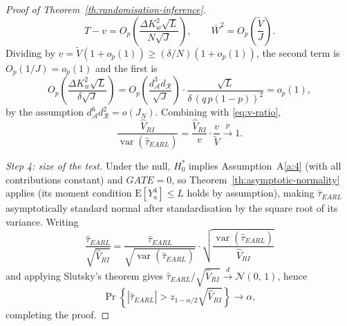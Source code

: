 \documentclass[sigconf,nonacm]{acmart}
\newcounter{assumption}
\newcommand{\E}{\mathrm E}
\DeclareMathOperator{\var}{var}
\begin{document}
\begin{proof}[Proof of Theorem~\ref{th:randomisation-inference}]
\begin{equation*}
        T - v = O_p\left(\frac{\Delta K_w^2\sqrt L}{N\sqrt J}\right),\qquad
        \bar W^2 = O_p\left(\frac{\tilde V}{J}\right).
    \end{equation*}
    Dividing by $v = \tilde V(1+o_p(1)) \ge (\delta/N)(1+o_p(1))$, the second term is $O_p(1/J) = o_p(1)$ and the first is
    \begin{equation*}
        O_p\left(\frac{\Delta K_w^2\sqrt L }{\delta\sqrt J}\right) = O_p\left(\frac{d^3_{\mathcal A}d_{\mathcal R}}{\sqrt{J}}\right)\cdot\frac{\sqrt L}{\delta\,(q\,p(1-p))^2} = o_p(1),
    \end{equation*}
    by the assumption $d^6_{\mathcal A}d^2_{\mathcal R} = o(J_N)$. Combining with \eqref{eq:v-ratio},
    \begin{equation*}
        \frac{\hat V_{RI}}{\var(\hat\tau^{\phantom{1}}_{EARL})} = \frac{\hat V_{RI}}{v}\cdot\frac{v}{\tilde V}\stackrel{p}{\to}1.
    \end{equation*}

    \emph{Step 4: size of the test.} Under the null, $H_0^*$ implies Assumption~A\ref{a:4} (with all contributions constant) and $GATE=0$, so Theorem~\ref{th:asymptotic-normality} applies (its moment condition $\E[Y_a^4]\le L$ holds by assumption), making $\hat\tau_{EARL}$ asymptotically standard normal after standardisation by the square root of its variance. Writing
    \begin{equation*}
        \frac{\hat\tau^{\phantom{1}}_{EARL}}{\sqrt{\hat V_{RI}}} = \frac{\hat\tau^{\phantom{1}}_{EARL}}{\sqrt{\var\left(\hat\tau^{\phantom{1}}_{EARL}\right)}} \cdot \sqrt{\frac{\var\left(\hat\tau^{\phantom{1}}_{EARL}\right)}{\hat V_{RI}}}
    \end{equation*}
    and applying Slutsky's theorem gives $\hat\tau_{EARL}/\sqrt{\hat V_{RI}}\stackrel{d}{\to}\mathcal N(0,\,1)$, hence
    \begin{equation*}
        \Pr\left\{\left|\hat\tau^{\phantom{1}}_{EARL}\right| > z_{1-\alpha/2}\sqrt{\hat V_{RI}}\right\}\to \alpha,
    \end{equation*}
    completing the proof.
\end{proof}
\end{document}
